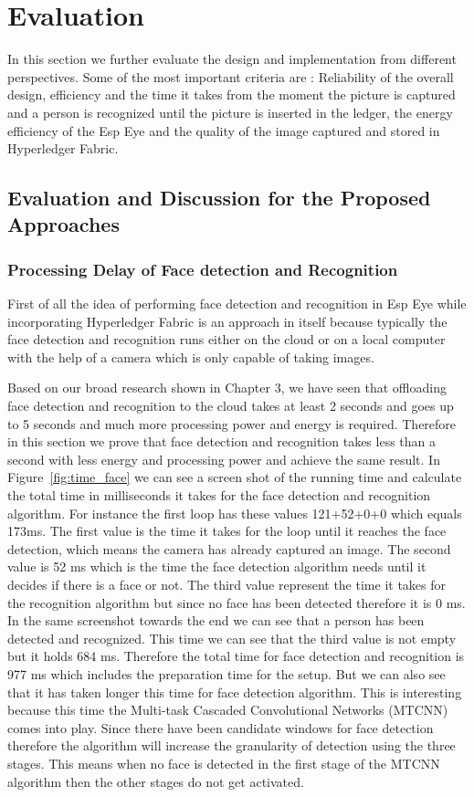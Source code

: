 \chapter{Evaluation}

In this section we further evaluate the design and implementation from different perspectives. Some of the most important criteria are : Reliability of the overall design, efficiency and the time it takes from the moment the picture is captured and a person is recognized until the picture is inserted in the ledger, the energy efficiency of the Esp Eye and the quality of the image captured and stored in Hyperledger Fabric.
\section{Evaluation and Discussion for the Proposed Approaches}

\subsection{Processing Delay of Face detection and Recognition}
First of all the idea of performing face detection and recognition in Esp Eye while incorporating Hyperledger Fabric is an approach in itself because typically the face detection and recognition runs either on the cloud or on a local computer with the help of a camera which is only capable of taking images. 

Based on our broad research shown in Chapter 3, we have seen that offloading face detection and recognition to the cloud takes at least 2 seconds and goes up to 5 seconds and much more processing power and energy is required. Therefore in this section we prove that face detection and recognition takes less than a second with less energy and processing power and achieve the same result. In Figure~\ref{fig:time_face} we can see a screen shot of the running time and calculate the total time in milliseconds it takes for the face detection and recognition algorithm. For instance the first loop has these values 121+52+0+0 which equals 173ms. The first value is the time it takes for the loop until it reaches the face detection, which means the camera has already captured an image. The second value is 52 ms which is the time the face detection algorithm needs until it decides if there is a face or not. The third value represent the time it takes for the recognition algorithm but since no face has been detected therefore it is 0 ms. In the same screenshot towards the end we can see that a person has been detected and recognized. This time we can see that the third value is not empty but it holds 684 ms. Therefore the total time for face detection and recognition is 977 ms which includes the preparation time for the setup. But we can also see that it has taken longer this time for face detection algorithm. This is interesting because this time the Multi-task Cascaded Convolutional Networks (MTCNN) comes into play. Since there have been candidate windows for face detection therefore the algorithm will increase the granularity of detection using the three stages. This means when no face is detected in the first stage of the MTCNN algorithm then the other stages do not get activated. 


